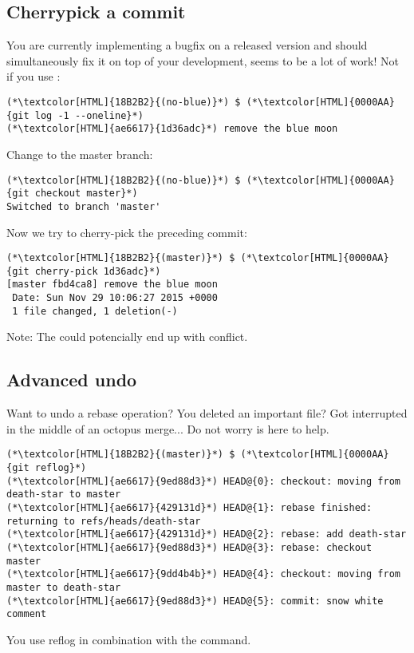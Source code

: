 \subsection{Cherrypick a commit}
\begin{frame}[fragile]
    \subslidetitle
  You are currently implementing a bugfix on a released version and should simultaneously fix it on top of your development, seems to be a lot of work! Not if you use :
  \begin{lstlisting}
(*\textcolor[HTML]{18B2B2}{(no-blue)}*) $ (*\textcolor[HTML]{0000AA}{git log -1 --oneline}*)
(*\textcolor[HTML]{ae6617}{1d36adc}*) remove the blue moon
\end{lstlisting}
  Change to the master branch:
  \begin{lstlisting}
(*\textcolor[HTML]{18B2B2}{(no-blue)}*) $ (*\textcolor[HTML]{0000AA}{git checkout master}*)
Switched to branch 'master'
\end{lstlisting}
  Now we try to cherry-pick the preceding commit:
  \begin{lstlisting}
(*\textcolor[HTML]{18B2B2}{(master)}*) $ (*\textcolor[HTML]{0000AA}{git cherry-pick 1d36adc}*)
[master fbd4ca8] remove the blue moon
 Date: Sun Nov 29 10:06:27 2015 +0000
 1 file changed, 1 deletion(-)
\end{lstlisting}
  Note:  The  could potencially end up with conflict.
\end{frame}

\subsection{Advanced undo}
\begin{frame}[fragile]
    \subslidetitle

  Want to undo a rebase operation? You deleted an important file? Got interrupted in the middle of an octopus merge... Do not worry  is here to help.

  \begin{lstlisting}
(*\textcolor[HTML]{18B2B2}{(master)}*) $ (*\textcolor[HTML]{0000AA}{git reflog}*)
(*\textcolor[HTML]{ae6617}{9ed88d3}*) HEAD@{0}: checkout: moving from death-star to master
(*\textcolor[HTML]{ae6617}{429131d}*) HEAD@{1}: rebase finished: returning to refs/heads/death-star
(*\textcolor[HTML]{ae6617}{429131d}*) HEAD@{2}: rebase: add death-star
(*\textcolor[HTML]{ae6617}{9ed88d3}*) HEAD@{3}: rebase: checkout master
(*\textcolor[HTML]{ae6617}{9dd4b4b}*) HEAD@{4}: checkout: moving from master to death-star
(*\textcolor[HTML]{ae6617}{9ed88d3}*) HEAD@{5}: commit: snow white comment
\end{lstlisting}

  You use reflog in combination with the  command.
\end{frame}


